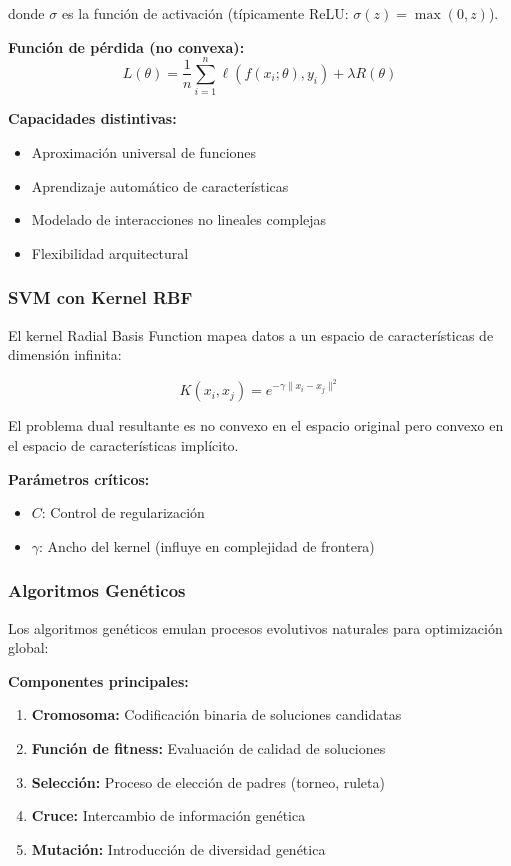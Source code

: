 \documentclass[12pt,a4paper]{article}
\begin{document}
donde $\sigma$ es la función de activación (típicamente ReLU: $\sigma(z) = \max(0,z)$).

\textbf{Función de pérdida (no convexa):}
\begin{equation}
L(\theta) = \frac{1}{n}\sum_{i=1}^{n} \ell(f(x_i;\theta), y_i) + \lambda R(\theta)
\end{equation}

\textbf{Capacidades distintivas:}
\begin{itemize}
    \item Aproximación universal de funciones
    \item Aprendizaje automático de características
    \item Modelado de interacciones no lineales complejas
    \item Flexibilidad arquitectural
\end{itemize}

\subsubsection{SVM con Kernel RBF}

El kernel Radial Basis Function mapea datos a un espacio de características de dimensión infinita:

\begin{equation}
K(x_i, x_j) = e^{-\gamma \|x_i - x_j\|^2}
\end{equation}

El problema dual resultante es no convexo en el espacio original pero convexo en el espacio de características implícito.

\textbf{Parámetros críticos:}
\begin{itemize}
    \item $C$: Control de regularización
    \item $\gamma$: Ancho del kernel (influye en complejidad de frontera)
\end{itemize}

\subsubsection{Algoritmos Genéticos}

Los algoritmos genéticos \cite{holland1992} emulan procesos evolutivos naturales para optimización global:

\textbf{Componentes principales:}
\begin{enumerate}
    \item \textbf{Cromosoma:} Codificación binaria de soluciones candidatas
    \item \textbf{Función de fitness:} Evaluación de calidad de soluciones
    \item \textbf{Selección:} Proceso de elección de padres (torneo, ruleta)
    \item \textbf{Cruce:} Intercambio de información genética
    \item \textbf{Mutación:} Introducción de diversidad genética
\end{enumerate}
\end{document}
